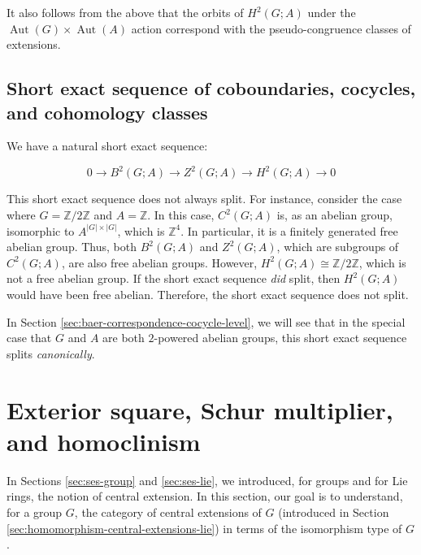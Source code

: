 It also follows from the above that the orbits of $H^2(G;A)$ under the
$\operatorname{Aut}(G) \times \operatorname{Aut}(A)$ action correspond
with the pseudo-congruence classes of extensions.

\subsection{Short exact sequence of coboundaries, cocycles, and cohomology classes}\label{sec:ses-coboundary-cocycle-cohomology}

We have a natural short exact sequence:

$$0 \to B^2(G;A) \to Z^2(G;A) \to H^2(G;A) \to 0$$

This short exact sequence does not always split. For instance,
consider the case where $G = \mathbb{Z}/2\mathbb{Z}$ and $A =
\mathbb{Z}$. In this case, $C^2(G;A)$ is, as an abelian group,
isomorphic to $A^{|G| \times |G|}$, which is $\mathbb{Z}^4$. In
particular, it is a finitely generated free abelian group. Thus, both
$B^2(G;A)$ and $Z^2(G;A)$, which are subgroups of $C^2(G;A)$, are also
free abelian groups. However, $H^2(G;A) \cong \mathbb{Z}/2\mathbb{Z}$, %
which is not a free abelian group. If the short exact sequence {\em
  did} split, then $H^2(G;A)$ would have been free abelian. Therefore,
the short exact sequence does not split.

In Section \ref{sec:baer-correspondence-cocycle-level}, we will see
that in the special case that $G$ and $A$ are both $2$-powered abelian
groups, this short exact sequence splits {\em canonically}.


\section{Exterior square, Schur multiplier, and homoclinism}\label{sec:exteriorsquare-and-homoclinism}

In Sections \ref{sec:ses-group} and \ref{sec:ses-lie}, we introduced,
for groups and for Lie rings, the notion of central extension. In this
section, our goal is to understand, for a group $G$, the category of
central extensions of $G$ (introduced in Section
\ref{sec:homomorphism-central-extensions-lie}) in terms of the
isomorphism type of $G$.

